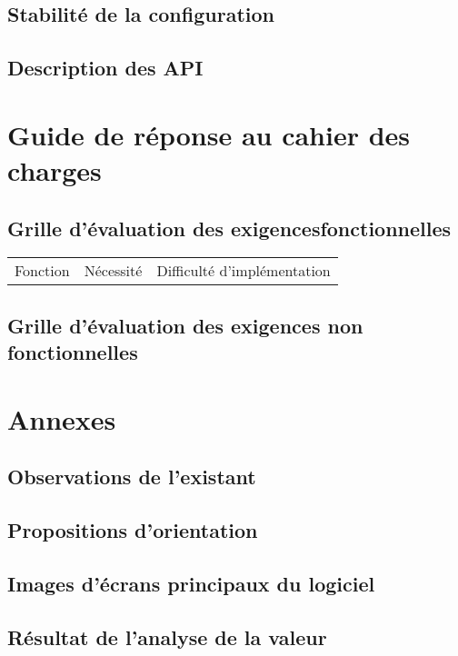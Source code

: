 \subsection{Stabilité de la configuration}


\subsection{Description des API}

\section{Guide de réponse au cahier des charges}
\subsection{Grille d'évaluation des exigencesfonctionnelles}
\begin{tabular}{|c|c|c|}
	\hline Fonction & Nécessité & Difficulté d'implémentation
\end{tabular}
\subsection{Grille d'évaluation des exigences non fonctionnelles}

\section{Annexes}
\subsection{Observations de l'existant}
\subsection{Propositions d'orientation}
\subsection{Images d'écrans principaux du logiciel}
\subsection{Résultat de l'analyse de la valeur}